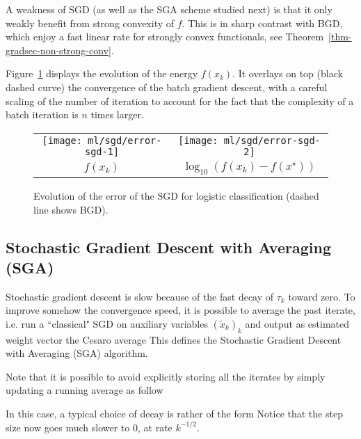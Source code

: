A weakness of SGD (as well as the SGA scheme studied next) is that it only weakly benefit from strong convexity of $f$. This is in sharp contrast with BGD, which enjoy a fast linear rate for strongly convex functionals, see Theorem~\ref{thm-gradsec-non-strong-conv}.

Figure~\ref{fig-sgd} displays the evolution of the energy $f(x_k)$. 
It overlays on top (black dashed curve) the convergence of the batch gradient descent, with a careful scaling of the 
number of iteration to account for the fact that the complexity of a batch iteration is $n$ times larger. 


\begin{figure}
\centering
\begin{tabular}{cc}
\texttt{[image: ml/sgd/error-sgd-1]} &
\texttt{[image: ml/sgd/error-sgd-2]} \\
$f(x_k)$ & $\log_{10}(f(x_k)-f(x^\star))$ 
\end{tabular}
\caption{\label{fig-sgd}
Evolution of the error of the SGD for logistic classification (dashed line shows BGD).
}
\end{figure}




\subsection{Stochastic Gradient Descent with Averaging (SGA)}
\label{sec-sga}

Stochastic gradient descent is slow because of the fast decay of
$\tau_k$ toward zero.
%
To improve somehow the convergence speed, it is possible to average the past
iterate, i.e. run a ``classical" SGD on auxiliary variables $( \tilde x_k)_k$
and output as estimated weight vector the Cesaro average
This defines the Stochastic Gradient Descent with Averaging (SGA)
algorithm.

Note that it is possible to avoid explicitly storing all the iterates by simply
updating a running average as follow


In this case, a typical choice of decay is rather of the form 
Notice that the step size now goes much slower to 0, at rate $k^{-1/2}$.



